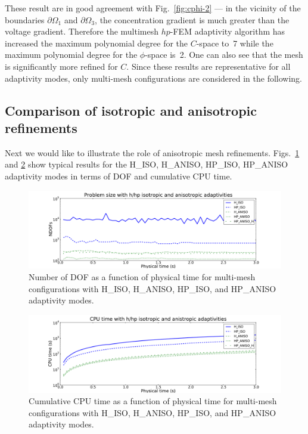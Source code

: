 These result are in good agreement with Fig.~\ref{fig:cphi-2} --- in the vicinity
of the boundaries $\partial \Omega_1$ and $\partial\Omega_3$, the concentration gradient
is much greater than the voltage gradient. Therefore the multimesh $hp$-FEM adaptivity 
algorithm has increased the maximum polynomial degree for the $C$-space to~7 while 
the maximum polynomial degree for the $\phi$-space is~2. One can also see that the mesh 
is significantly more refined for $C$.
Since these results are representative for all adaptivity modes, only multi-mesh 
configurations are considered in the following. 

\subsection{Comparison of isotropic and anisotropic refinements}

Next we would like to illustrate the role of anisotropic mesh refinements.
Figs.~\ref{fig:isoanisodof} and \ref{fig:isoanisocpu} show typical results 
for the H\_ISO, H\_ANISO, HP\_ISO, HP\_ANISO adaptivity modes in terms 
of DOF and cumulative CPU time.


\begin{figure}[!ht]
  \begin{centering}
  \includegraphics[width=\columnwidth]{isoaniso_dof}
  \caption{\label{fig:isoanisodof} Number of DOF as a function of physical time for 
  multi-mesh configurations with H\_ISO, H\_ANISO,
  HP\_ISO, and HP\_ANISO adaptivity modes.}
  \end{centering}
\end{figure}

\begin{figure}[!ht]
  \begin{centering}
  \includegraphics[width=\columnwidth]{isoaniso_cpu}
  \caption{\label{fig:isoanisocpu} Cumulative CPU time as a function of physical time 
  for multi-mesh configurations with H\_ISO, H\_ANISO,
  HP\_ISO, and HP\_ANISO adaptivity modes.}
  \end{centering}
\end{figure}

